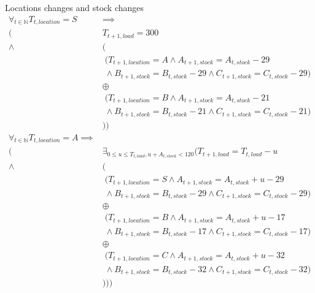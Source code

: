 Locations changes and stock changes
\begin{align*}
\forall_{t \in \mathbb{N}}T_{t,location}=S& \implies \\
				  (&T_{t+1,load} = 300 \\
		   \land  &( \\
			   &\; (T_{t+1,location}=A \land A_{t+1,stock} = A_{t,stock}-29 \\
			   &\; \land B_{t+1,stock} = B_{t,stock}-29 \land C_{t+1,stock} = C_{t,stock}-29) \\
			   &\oplus \\
			   &\; (T_{t+1,location}=B \land A_{t+1,stock} = A_{t,stock}-21 \\
			   &\; \land B_{t+1,stock} = B_{t,stock}-21 \land C_{t+1,stock} = C_{t,stock}-21) \\
			   &)) \\
\forall_{t \in \mathbb{N}}T_{t,location}=A \implies \\
				  (&\exists_{0 \le u \le T_{t,load},u+A_{t,stock}<120}( T_{t+1,load} = T_{t,load}-u \\
		   \land  &( \\
		   &\; (T_{t+1,location}=S \land A_{t+1,stock} = A_{t,stock}+u-29 \\
		   &\; \land B_{t+1,stock} = B_{t,stock}-29 \land C_{t+1,stock} = C_{t,stock}-29) \\
		   &\oplus \\
		   &\;(T_{t+1,location}=B \land A_{t+1,stock} = A_{t,stock}+u-17 \\
		   &\; \land B_{t+1,stock} = B_{t,stock}-17 \land C_{t+1,stock} = C_{t,stock}-17) \\
           &\oplus \\
           &\; (T_{t+1,location}=C \land A_{t+1,stock} = A_{t,stock}+u-32 \\
           &\; \land B_{t+1,stock} = B_{t,stock}-32 \land C_{t+1,stock} = C_{t,stock}-32) \\
           &)))
\end{align*}


